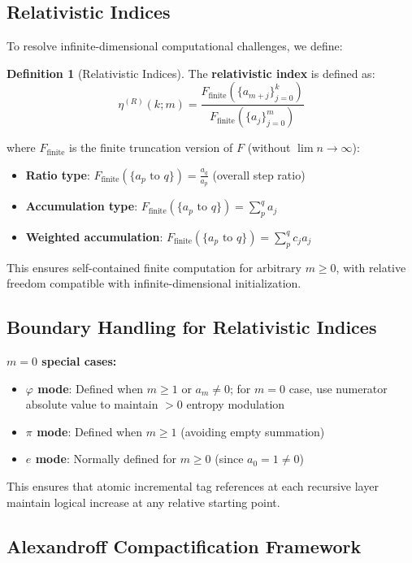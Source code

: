 \documentclass[12pt]{article}
\theoremstyle{plain}
\theoremstyle{definition}
\newtheorem{definition}[theorem]{Definition}
\begin{document}
\subsection{Relativistic Indices}

To resolve infinite-dimensional computational challenges, we define:

\begin{definition}[Relativistic Indices]
The \textbf{relativistic index} is defined as:
$$\eta^{(R)}(k; m) = \frac{F_{\text{finite}}(\{a_{m+j}\}_{j=0}^k)}{F_{\text{finite}}(\{a_j\}_{j=0}^m)}$$

where $F_{\text{finite}}$ is the finite truncation version of $F$ (without $\lim n \to \infty$):
\begin{itemize}
\item \textbf{Ratio type}: $F_{\text{finite}}(\{a_p \text{ to } q\}) = \frac{a_q}{a_p}$ (overall step ratio)
\item \textbf{Accumulation type}: $F_{\text{finite}}(\{a_p \text{ to } q\}) = \sum_{p}^q a_j$
\item \textbf{Weighted accumulation}: $F_{\text{finite}}(\{a_p \text{ to } q\}) = \sum_{p}^q c_j a_j$
\end{itemize}

This ensures self-contained finite computation for arbitrary $m \geq 0$, with relative freedom compatible with infinite-dimensional initialization.
\end{definition}

\subsection{Boundary Handling for Relativistic Indices}

\textbf{$m=0$ special cases:}
\begin{itemize}
\item \textbf{$\varphi$ mode}: Defined when $m \geq 1$ or $a_m \neq 0$; for $m=0$ case, use numerator absolute value to maintain $> 0$ entropy modulation
\item \textbf{$\pi$ mode}: Defined when $m \geq 1$ (avoiding empty summation)
\item \textbf{$e$ mode}: Normally defined for $m \geq 0$ (since $a_0 = 1 \neq 0$)
\end{itemize}

This ensures that atomic incremental tag references at each recursive layer maintain logical increase at any relative starting point.

\subsection{Alexandroff Compactification Framework}
\end{document}
